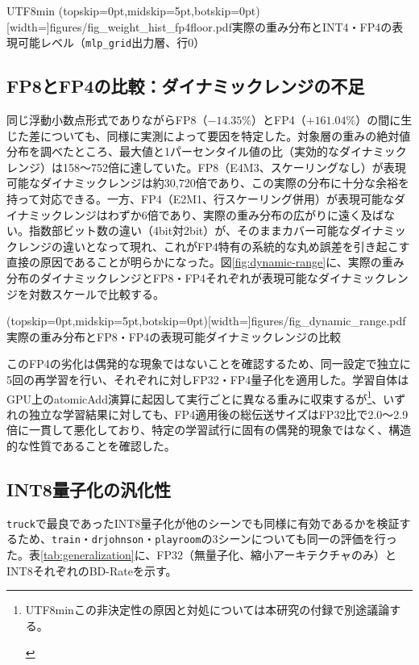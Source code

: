 \documentclass{ieeeaccess}
\begin{document}
\begin{CJK}{UTF8}{min}
\Figure[t!](topskip=0pt,midskip=5pt,botskip=0pt)[width=\columnwidth]{figures/fig_weight_hist_fp4floor.pdf}{実際の重み分布とINT4・FP4の表現可能レベル（\texttt{mlp\_grid}出力層、行0）\label{fig:weight-hist}}

\subsection{FP8とFP4の比較：ダイナミックレンジの不足}
同じ浮動小数点形式でありながらFP8（$-14.35\%$）とFP4（$+161.04\%$）の間に生じた差についても、同様に実測によって要因を特定した。対象層の重みの絶対値分布を調べたところ、最大値と1パーセンタイル値の比（実効的なダイナミックレンジ）は158〜752倍に達していた。FP8（E4M3、スケーリングなし）が表現可能なダイナミックレンジは約30{,}720倍であり、この実際の分布に十分な余裕を持って対応できる。一方、FP4（E2M1、行スケーリング併用）が表現可能なダイナミックレンジはわずか6倍であり、実際の重み分布の広がりに遠く及ばない。指数部ビット数の違い（4bit対2bit）が、そのままカバー可能なダイナミックレンジの違いとなって現れ、これがFP4特有の系統的な丸め誤差を引き起こす直接の原因であることが明らかになった。図\ref{fig:dynamic-range}に、実際の重み分布のダイナミックレンジとFP8・FP4それぞれが表現可能なダイナミックレンジを対数スケールで比較する。

\Figure[t!](topskip=0pt,midskip=5pt,botskip=0pt)[width=\columnwidth]{figures/fig_dynamic_range.pdf}{実際の重み分布とFP8・FP4の表現可能ダイナミックレンジの比較\label{fig:dynamic-range}}

このFP4の劣化は偶発的な現象ではないことを確認するため、同一設定で独立に5回の再学習を行い、それぞれに対しFP32・FP4量子化を適用した。学習自体はGPU上のatomicAdd演算に起因して実行ごとに異なる重みに収束するが\footnote{\begin{CJK}{UTF8}{min}この非決定性の原因と対処については本研究の付録で別途議論する。\end{CJK}}、いずれの独立な学習結果に対しても、FP4適用後の総伝送サイズはFP32比で2.0〜2.9倍に一貫して悪化しており、特定の学習試行に固有の偶発的現象ではなく、構造的な性質であることを確認した。

\subsection{INT8量子化の汎化性}
\texttt{truck}で最良であったINT8量子化が他のシーンでも同様に有効であるかを検証するため、\texttt{train}・\texttt{drjohnson}・\texttt{playroom}の3シーンについても同一の評価を行った。表\ref{tab:generalization}に、FP32（無量子化、縮小アーキテクチャのみ）とINT8それぞれのBD-Rateを示す。


\end{CJK}
\end{document}
